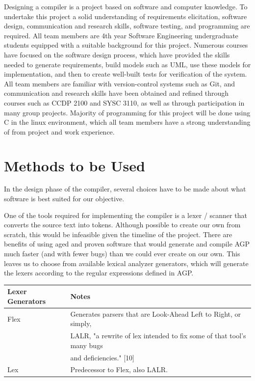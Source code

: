 \documentclass[11pt]{article}
\begin{document}
Designing a compiler is a project based on software and computer knowledge. To undertake this project a solid understanding of requirements elicitation, software design, communication and research skills, software testing, and programming are required.  All team members are 4th year Software Engineering undergraduate students equipped with a suitable background for this project. Numerous courses have focused on the software design process, which have provided the skills needed to generate requirements, build models such as UML, use these models for implementation, and then to create well-built tests for verification of the system. All team members are familiar with version-control systems such as Git, and communication and research skills have been obtained and refined through courses such as CCDP 2100 and SYSC 3110, as well as through participation in many group projects. Majority of programming for this project will be done using C in the linux environment, which all team members have a strong understanding of from project and work experience.


\section{Methods to be Used}

In the design phase of the compiler, several choices have to be made about what software is best suited for our objective. 

One of the tools required for implementing the compiler is a lexer / scanner that converts the source text into tokens. Although possible to create our own from scratch, this would be infeasible given the timeline of the project. There are benefits of using aged and proven software that would generate and compile AGP much faster (and with fewer bugs) than we could ever create on our own. This leaves us to choose from available lexical analyzer generators, which will generate the lexers according to the regular expressions defined in AGP.

\begin{center}
\begin{tabular}{ |l | l|  }
 \hline
 \textbf{Lexer Generators} & \textbf{Notes} \\
 \hline 
 Flex & Generates parsers that are Look-Ahead Left to Right, or simply,\\ 
 	  &
 LALR, "a rewrite of lex intended to fix some of that tool's many bugs \\
 	  &
 and deficiencies." [10] \\ 
 \hline 
 Lex & Predecessor to Flex, also LALR. \\
 \hline
\end{tabular}
\end{center}
\end{document}

